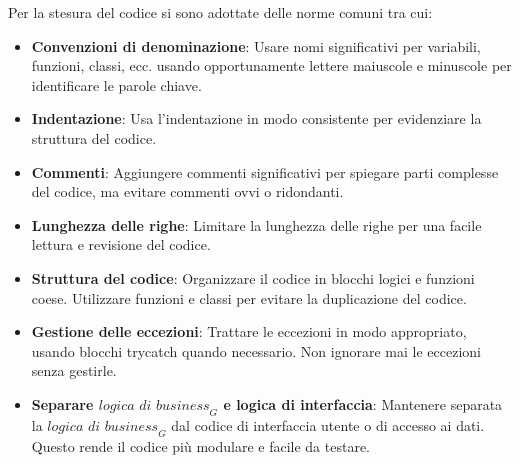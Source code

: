 Per la stesura del codice si sono adottate delle norme comuni tra cui:
\begin{itemize}
    \item \textbf{Convenzioni di denominazione}: Usare nomi significativi per variabili, funzioni, classi, ecc. usando opportunamente lettere maiuscole e minuscole per
    identificare le parole chiave.
    
    \item \textbf{Indentazione}: Usa l'indentazione in modo consistente per evidenziare la struttura del codice. 
    
    \item \textbf{Commenti}: Aggiungere commenti significativi per spiegare parti complesse del codice, ma evitare commenti ovvi o ridondanti. 
    
    \item \textbf{Lunghezza delle righe}: Limitare la lunghezza delle righe per una facile lettura e revisione del codice. 
    
    \item \textbf{Struttura del codice}: Organizzare il codice in blocchi logici e funzioni coese. Utilizzare funzioni e classi per evitare la duplicazione del codice.
    
    \item \textbf{Gestione delle eccezioni}: Trattare le eccezioni in modo appropriato, usando blocchi try\-catch quando necessario. Non ignorare mai le eccezioni senza gestirle.

     \item \textbf{Separare $\textit{logica di business}_G$ e logica di interfaccia}: Mantenere separata la $\textit{logica di business}_G$ dal codice di interfaccia utente o di accesso ai dati. Questo rende il codice più modulare e facile da testare.
\end{itemize}

